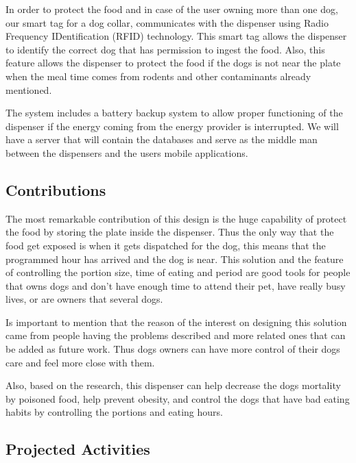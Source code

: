 \documentclass[12pt]{article}
\begin{document}
In order to protect the food and in case of the user owning more than one dog, our smart tag for a dog collar, communicates with the dispenser using Radio Frequency IDentification (RFID) technology. This smart tag allows the dispenser to identify the correct dog that has permission to ingest the food. Also, this feature allows the dispenser to protect the food if the dogs is not near the plate when the meal time comes from rodents and other contaminants already mentioned.

The system includes a battery backup system to allow  proper functioning of the dispenser if the energy coming from the energy provider is interrupted. We will have a server that will contain the databases and serve as the middle man between the dispensers and the users mobile applications.

\subsection{Contributions}

The most remarkable contribution of this design is the huge capability of protect the food by storing the plate inside the dispenser. Thus the only way that the food get exposed is when it gets dispatched for the dog, this means that the programmed hour has arrived and the dog is near. This solution and the feature of controlling the portion size, time of eating and period are good tools for people that owns dogs and don't have enough time to attend their pet, have really busy lives, or are owners that several dogs.

Is important to mention that the reason of the interest on designing this solution came from people having the problems described and more related ones that can be added as future work. Thus dogs owners can have more control of their dogs care and feel more close with them.

Also, based on the research, this dispenser can help decrease the dogs mortality by poisoned food, help prevent obesity, and control the dogs that have bad eating habits by controlling the portions and eating hours.
\newpage

\subsection{Projected Activities}
\end{document}
